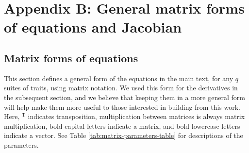 
\renewcommand{\thefigure}{B\arabic{figure}}
\renewcommand{\theequation}{B\arabic{equation}}
\renewcommand{\thetable}{B\arabic{table}}
\setcounter{equation}{0}
\setcounter{figure}{0}
\setcounter{table}{0}


\section*{Appendix B: General matrix forms of equations and Jacobian}




\subsection*{Matrix forms of equations}


This section defines a general form of the equations in the main text, 
for any $q$ suites of traits, using matrix notation.
We used this form for the derivatives in the subsequent section, and 
we believe that keeping them in a more general form will help make them 
more useful to those interested in building from this work.
Here, $^{\textrm{T}}$ indicates transposition,
multiplication between matrices is always matrix multiplication,
bold capital letters indicate a matrix, and bold lowercase letters indicate 
a vector.
See Table \ref{tab:matrix-parameters-table} for descriptions of the parameters.



